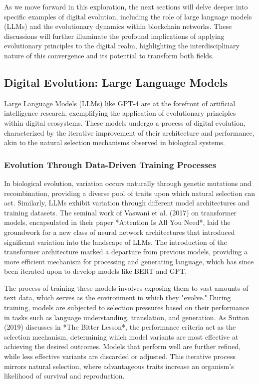 \documentclass[12pt,twoside]{article}
\begin{document}
As we move forward in this exploration, the next sections will delve deeper into specific examples of digital evolution, including the role of large language models (LLMs) and the evolutionary dynamics within blockchain networks. These discussions will further illuminate the profound implications of applying evolutionary principles to the digital realm, highlighting the interdisciplinary nature of this convergence and its potential to transform both fields.

\subsection{Digital Evolution: Large Language Models}

Large Language Models (LLMs) like GPT-4 are at the forefront of artificial intelligence research, exemplifying the application of evolutionary principles within digital ecosystems. These models undergo a process of digital evolution, characterized by the iterative improvement of their architecture and performance, akin to the natural selection mechanisms observed in biological systems.

\subsubsection{Evolution Through Data-Driven Training Processes}

In biological evolution, variation occurs naturally through genetic mutations and recombination, providing a diverse pool of traits upon which natural selection can act. Similarly, LLMs exhibit variation through different model architectures and training datasets. The seminal work of Vaswani et al. (2017) on transformer models, encapsulated in their paper *Attention Is All You Need*, laid the groundwork for a new class of neural network architectures that introduced significant variation into the landscape of LLMs. The introduction of the transformer architecture marked a departure from previous models, providing a more efficient mechanism for processing and generating language, which has since been iterated upon to develop models like BERT and GPT.

The process of training these models involves exposing them to vast amounts of text data, which serves as the environment in which they "evolve." During training, models are subjected to selection pressures based on their performance in tasks such as language understanding, translation, and generation. As Sutton (2019) discusses in *The Bitter Lesson*, the performance criteria act as the selection mechanism, determining which model variants are most effective at achieving the desired outcomes. Models that perform well are further refined, while less effective variants are discarded or adjusted. This iterative process mirrors natural selection, where advantageous traits increase an organism's likelihood of survival and reproduction.
\end{document}
